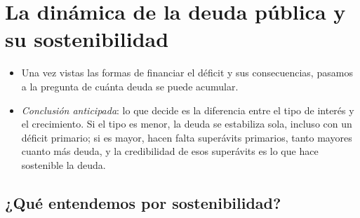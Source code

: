 \documentclass[11pt]{article}
\begin{document}
\section{La dinámica de la deuda pública y su sostenibilidad}\label{sec:dinamica}

\begin{itemize}
\item Una vez vistas las formas de financiar el déficit y sus consecuencias, pasamos a la pregunta de cuánta deuda se puede acumular.
\item \emph{Conclusión anticipada}: lo que decide es la diferencia entre el tipo de interés y el crecimiento. Si el tipo es menor, la deuda se estabiliza sola, incluso con un déficit primario; si es mayor, hacen falta superávits primarios, tanto mayores cuanto más deuda, y la credibilidad de esos superávits es lo que hace sostenible la deuda.
\end{itemize}

\subsection{¿Qué entendemos por sostenibilidad?}\label{sec:sostenibilidad}
\end{document}
